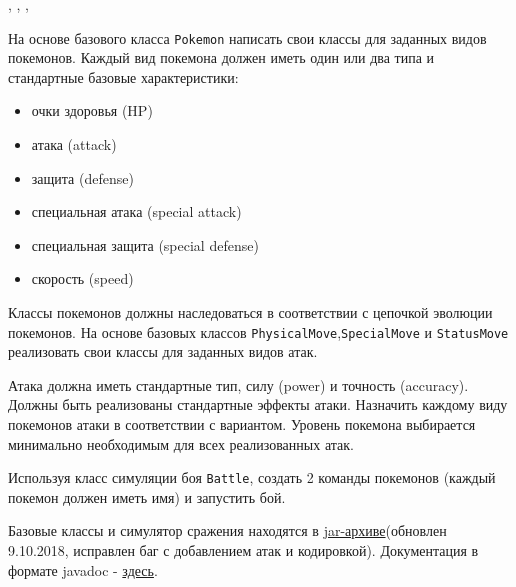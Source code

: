     


    \tableofcontents


    \newpage
    \Chapter{\lab\ \labnumber}{\labtheme}{}


    \begin{center}
        , , ,
    \end{center}
    \noindent
%
    На основе базового класса \verb|Pokemon| написать свои классы для заданных видов покемонов.
    Каждый вид покемона должен иметь один или два типа и стандартные базовые характеристики:
    \begin{itemize}
        \item очки здоровья (HP)
        \item атака (attack)
        \item защита (defense)
        \item специальная атака (special attack)
        \item специальная защита (special defense)
        \item скорость (speed)
    \end{itemize}

    Классы покемонов должны наследоваться в соответствии с цепочкой эволюции покемонов.
    На основе базовых классов \verb|PhysicalMove|,\verb|SpecialMove| и \verb|StatusMove| реализовать свои классы для заданных видов атак.

    Атака должна иметь стандартные тип, силу (power) и точность (accuracy).
    Должны быть реализованы стандартные эффекты атаки.
    Назначить каждому виду покемонов атаки в соответствии с вариантом.
    Уровень покемона выбирается минимально необходимым для всех реализованных атак.

    Используя класс симуляции боя \verb|Battle|, создать 2 команды покемонов (каждый покемон должен иметь имя) и запустить бой.

    Базовые классы и симулятор сражения находятся в \href{https://se.ifmo.ru/documents/10180/660917/Pokemon.jar/a7ce60af-6ee6-47d0-a95e-e5ed9a697bd2}{jar-архиве}(обновлен 9.10.2018, исправлен баг с добавлением атак и кодировкой).
    Документация в формате javadoc - \href{https://se.ifmo.ru/~tony/doc/}{здесь}.

